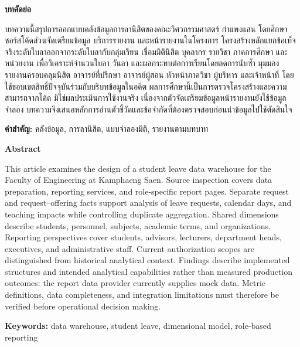 \begin{center}{\bfseries\fontsize{20pt}{24pt}\selectfont บทคัดย่อ}
\end{center}
บทความนี้สรุปการออกแบบคลังข้อมูลการลานิสิตของคณะวิศวกรรมศาสตร์ กำแพงแสน โดยศึกษาซอร์สโค้ดส่วนจัดเตรียมข้อมูล บริการรายงาน และหน้ารายงานในโครงการ โครงสร้างหลักแยกข้อเท็จจริงระดับใบลาออกจากระดับใบลากับกลุ่มเรียน เชื่อมมิตินิสิต บุคลากร รายวิชา ภาคการศึกษา และหน่วยงาน เพื่อวิเคราะห์จำนวนใบลา วันลา และผลกระทบต่อการเรียนโดยลดการนับซ้ำ มุมมองรายงานครอบคลุมนิสิต อาจารย์ที่ปรึกษา อาจารย์ผู้สอน หัวหน้าภาควิชา ผู้บริหาร และเจ้าหน้าที่ โดยใช้ขอบเขตสิทธิ์ปัจจุบันร่วมกับบริบทข้อมูลในอดีต ผลการศึกษานี้เป็นการตรวจโครงสร้างและความสามารถจากโค้ด มิใช่ผลประเมินการใช้งานจริง เนื่องจากตัวจัดเตรียมข้อมูลหน้ารายงานยังใช้ข้อมูลจำลอง บทความจึงเสนอหลักการอ่านตัวชี้วัดและข้อจำกัดที่ต้องตรวจสอบก่อนนำข้อมูลไปใช้ตัดสินใจ

\noindent\textbf{คำสำคัญ:} คลังข้อมูล, การลานิสิต, แบบจำลองมิติ, รายงานตามบทบาท

\clearpage{}
\begin{center}{\bfseries\fontsize{20pt}{24pt}\selectfont Abstract}
\end{center}
This article examines the design of a student leave data warehouse for the Faculty of Engineering at Kamphaeng Saen. Source inspection covers data preparation, reporting services, and role-specific report pages. Separate request and request--offering facts support analysis of leave requests, calendar days, and teaching impacts while controlling duplicate aggregation. Shared dimensions describe students, personnel, subjects, academic terms, and organizations. Reporting perspectives cover students, advisors, lecturers, department heads, executives, and administrative staff. Current authorization scopes are distinguished from historical analytical context. Findings describe implemented structures and intended analytical capabilities rather than measured production outcomes: the report data provider currently supplies mock data. Metric definitions, data completeness, and integration limitations must therefore be verified before operational decision making.

\noindent\textbf{Keywords:} data warehouse, student leave, dimensional model, role-based reporting
